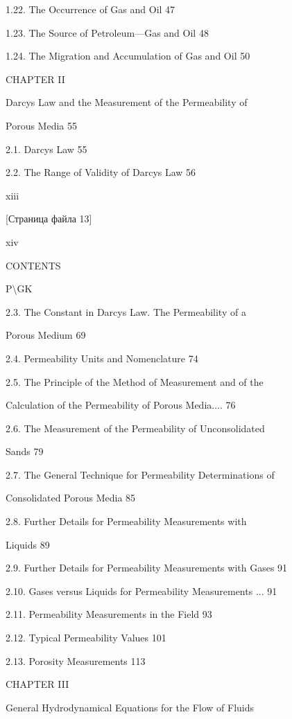 \documentclass[
  11pt,
]{article}
\begin{document}
1.22. The Occurrence of Gas and Oil 47 \par
1.23. The Source of Petroleum---Gas and Oil 48 \par
1.24. The Migration and Accumulation of Gas and Oil 50 \par
CHAPTER II \par
Darcy\textquotesingle s Law and the Measurement of the Permeability of \par
Porous Media 55 \par
2.1. Darcy\textquotesingle s Law 55 \par
2.2. The Range of Validity of Darcy\textquotesingle s Law 56 \par
xiii \par
\smallskip
\smallskip
\smallskip
{[}Страница файла 13{]}\par
xiv \par
CONTENTS \par
P\textbackslash GK \par
2.3. The Constant in Darcy\textquotesingle s Law. The Permeability of a \par
Porous Medium 69 \par
2.4. Permeability Units and Nomenclature 74 \par
2.5. The Principle of the Method of Measurement and of the \par
Calculation of the Permeability of Porous Media.... 76 \par
2.6. The Measurement of the Permeability of Unconsolidated \par
Sands 79 \par
2.7. The General Technique for Permeability Determinations of \par
Consolidated Porous Media 85 \par
2.8. Further Details for Permeability Measurements with \par
Liquids 89 \par
2.9. Further Details for Permeability Measurements with Gases 91 \par
2.10. Gases versus Liquids for Permeability Measurements ... 91 \par
2.11. Permeability Measurements in the Field 93 \par
2.12. Typical Permeability Values 101 \par
2.13. Porosity Measurements 113 \par
CHAPTER III \par
General Hydrodynamical Equations for the Flow of Fluids \par
\end{document}
